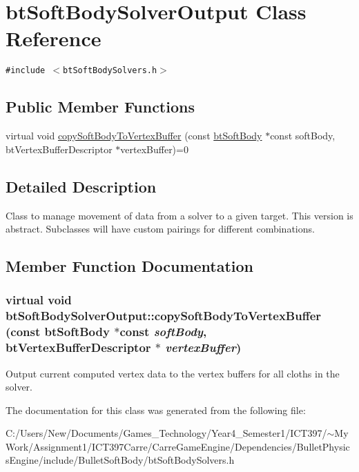 \hypertarget{classbt_soft_body_solver_output}{
\section{btSoftBodySolverOutput Class Reference}
\label{classbt_soft_body_solver_output}
}
{\tt \#include $<$btSoftBodySolvers.h$>$}

\subsection*{Public Member Functions}
\begin{CompactItemize}
\item 
virtual void \hyperlink{classbt_soft_body_solver_output_7c3761747267f87da347aad276218663}{copySoftBodyToVertexBuffer} (const \hyperlink{classbt_soft_body}{btSoftBody} $\ast$const softBody, btVertexBufferDescriptor $\ast$vertexBuffer)=0
\end{CompactItemize}


\subsection{Detailed Description}
Class to manage movement of data from a solver to a given target. This version is abstract. Subclasses will have custom pairings for different combinations. 

\subsection{Member Function Documentation}
\hypertarget{classbt_soft_body_solver_output_7c3761747267f87da347aad276218663}{
\subsubsection[copySoftBodyToVertexBuffer]{\setlength{\rightskip}{0pt plus 5cm}virtual void btSoftBodySolverOutput::copySoftBodyToVertexBuffer (const {\bf btSoftBody} $\ast$const  {\em softBody}, \/  btVertexBufferDescriptor $\ast$ {\em vertexBuffer})}}
\label{classbt_soft_body_solver_output_7c3761747267f87da347aad276218663}


Output current computed vertex data to the vertex buffers for all cloths in the solver. 

The documentation for this class was generated from the following file:\begin{CompactItemize}
\item 
C:/Users/New/Documents/Games\_\-Technology/Year4\_\-Semester1/ICT397/$\sim$My Work/Assignment1/ICT397Carre/CarreGameEngine/Dependencies/BulletPhysicsEngine/include/BulletSoftBody/btSoftBodySolvers.h\end{CompactItemize}
